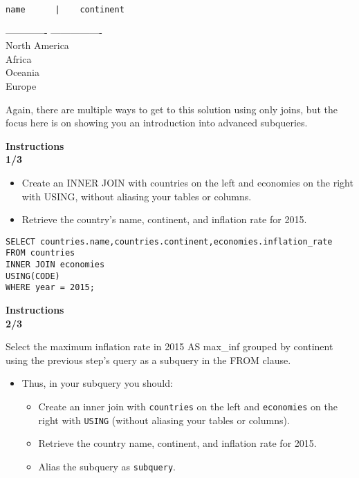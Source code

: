 \documentclass[
]{article}
\providecommand{\tightlist}{%
  \setlength{\itemsep}{0pt}\setlength{\parskip}{0pt}}
\begin{document}
\begin{verbatim}
name      |    continent
\end{verbatim}

------------- \textbar{} ----------------\\
\textbar{} North America\\
\textbar{} Africa\\
\textbar{} Oceania\\
\textbar{} Europe

Again, there are multiple ways to get to this solution using only joins,
but the focus here is on showing you an introduction into advanced
subqueries.

\textbf{Instructions}\\
\textbf{1/3}

\begin{itemize}
\tightlist
\item
  Create an INNER JOIN with countries on the left and economies on the
  right with USING, without aliasing your tables or columns.\\
\item
  Retrieve the country's name, continent, and inflation rate for 2015.
\end{itemize}

\begin{verbatim}
SELECT countries.name,countries.continent,economies.inflation_rate
FROM countries
INNER JOIN economies
USING(CODE)
WHERE year = 2015;
\end{verbatim}

\textbf{Instructions}\\
\textbf{2/3}

Select the maximum inflation rate in 2015 AS max\_inf grouped by
continent using the previous step's query as a subquery in the FROM
clause.

\begin{itemize}
\tightlist
\item
  Thus, in your subquery you should:

  \begin{itemize}
  \tightlist
  \item
    Create an inner join with \texttt{countries} on the left and
    \texttt{economies} on the right with \texttt{USING} (without
    aliasing your tables or columns).\\
  \item
    Retrieve the country name, continent, and inflation rate for 2015.\\
  \item
    Alias the subquery as \texttt{subquery}.
  \end{itemize}
\end{itemize}
\end{document}
